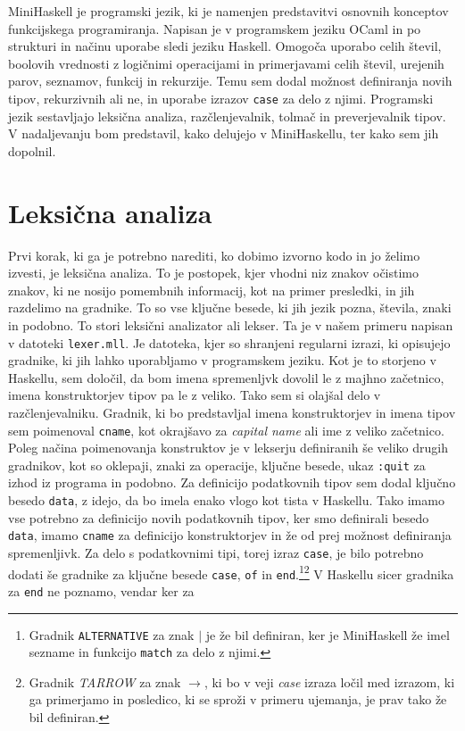 \documentclass[a4paper,12pt,openright]{book}
\begin{document}
MiniHaskell je programski jezik, ki je namenjen predstavitvi osnovnih konceptov funkcijskega programiranja. Napisan je v programskem jeziku 
OCaml in po strukturi in načinu uporabe sledi jeziku Haskell. Omogoča uporabo celih števil, boolovih vrednosti z logičnimi operacijami in primerjavami 
celih števil, urejenih parov, seznamov, funkcij in rekurzije. Temu sem dodal možnost definiranja novih tipov, rekurzivnih ali ne, in 
uporabe izrazov \lstinline{case} za delo z njimi. Programski jezik sestavljajo leksična analiza, razčlenjevalnik, tolmač in preverjevalnik tipov. V nadaljevanju bom predstavil, kako 
delujejo v MiniHaskellu, ter kako sem jih dopolnil.

\section{Leksična analiza}
Prvi korak, ki ga je potrebno narediti, ko dobimo izvorno kodo in jo želimo izvesti, je leksična analiza. To je postopek, kjer vhodni niz znakov očistimo znakov, ki ne nosijo pomembnih informacij, kot 
na primer presledki, in jih razdelimo na gradnike. To so vse ključne besede, ki jih jezik pozna, števila, znaki in podobno. To stori leksični analizator ali lekser. 
Ta je v našem primeru napisan v datoteki \lstinline{lexer.mll}. Je datoteka, kjer so shranjeni regularni izrazi, ki opisujejo gradnike, ki jih lahko uporabljamo v programskem jeziku. 
Kot je to storjeno v Haskellu, sem določil, da bom imena spremenljvk dovolil le z majhno začetnico, imena konstruktorjev tipov pa le z veliko. Tako sem si olajšal delo v razčlenjevalniku. 
Gradnik, ki bo predstavljal imena konstruktorjev in imena tipov sem poimenoval \lstinline{cname}, kot okrajšavo za \textit{capital name} ali ime z veliko začetnico. Poleg načina poimenovanja 
konstruktov je v lekserju definiranih še veliko drugih gradnikov, kot so oklepaji, znaki za operacije, ključne besede, ukaz \lstinline{:quit} za izhod iz programa 
in podobno. Za definicijo podatkovnih tipov sem dodal ključno besedo \lstinline{data}, z idejo, da bo imela enako vlogo kot tista v Haskellu. Tako imamo vse potrebno za 
definicijo novih podatkovnih tipov, ker smo definirali besedo \lstinline{data}, imamo \lstinline{cname} za definicijo konstruktorjev in že od prej možnost definiranja spremenljivk.
Za delo s podatkovnimi tipi, torej izraz \lstinline{case}, je bilo potrebno dodati še gradnike za ključne besede \lstinline{case}, \lstinline{of} in \lstinline{end}.\footnote{Gradnik \lstinline{ALTERNATIVE} 
za znak $\mid$ je že bil definiran, ker je MiniHaskell že imel sezname in funkcijo \lstinline{match} za delo z njimi.}\footnote{Gradnik \emph{TARROW} za znak \emph{$\rightarrow$}, ki bo v veji \emph{case} 
izraza ločil med izrazom, ki ga primerjamo in posledico, ki se sproži v primeru ujemanja, je prav tako že bil definiran.} V Haskellu sicer gradnika za \lstinline{end} ne poznamo, vendar ker za 
\end{document}

